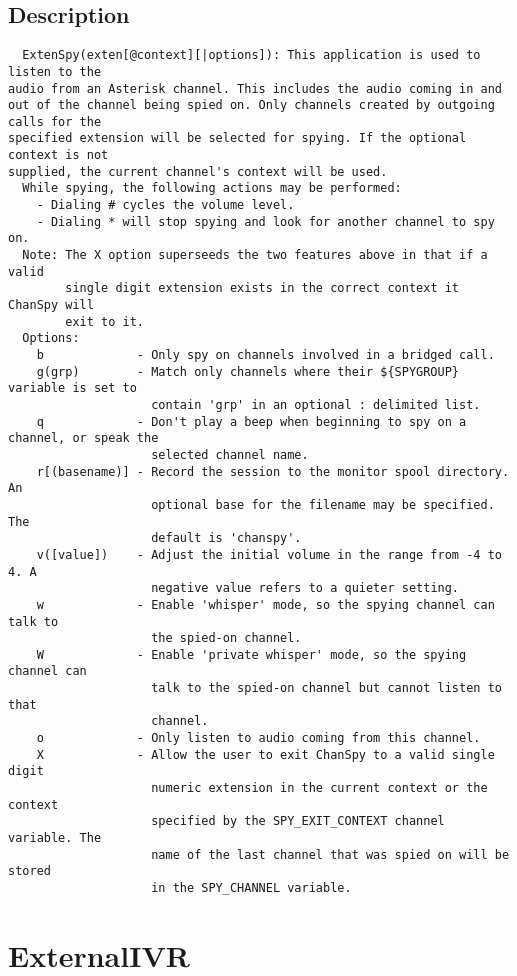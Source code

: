 \subsection{Description}
\begin{verbatim}
  ExtenSpy(exten[@context][|options]): This application is used to listen to the
audio from an Asterisk channel. This includes the audio coming in and
out of the channel being spied on. Only channels created by outgoing calls for the
specified extension will be selected for spying. If the optional context is not
supplied, the current channel's context will be used.
  While spying, the following actions may be performed:
    - Dialing # cycles the volume level.
    - Dialing * will stop spying and look for another channel to spy on.
  Note: The X option superseeds the two features above in that if a valid
        single digit extension exists in the correct context it ChanSpy will
        exit to it.
  Options:
    b             - Only spy on channels involved in a bridged call.
    g(grp)        - Match only channels where their ${SPYGROUP} variable is set to
                    contain 'grp' in an optional : delimited list.
    q             - Don't play a beep when beginning to spy on a channel, or speak the
                    selected channel name.
    r[(basename)] - Record the session to the monitor spool directory. An
                    optional base for the filename may be specified. The
                    default is 'chanspy'.
    v([value])    - Adjust the initial volume in the range from -4 to 4. A
                    negative value refers to a quieter setting.
    w             - Enable 'whisper' mode, so the spying channel can talk to
                    the spied-on channel.
    W             - Enable 'private whisper' mode, so the spying channel can
                    talk to the spied-on channel but cannot listen to that
                    channel.
    o             - Only listen to audio coming from this channel.
    X             - Allow the user to exit ChanSpy to a valid single digit
                    numeric extension in the current context or the context
                    specified by the SPY_EXIT_CONTEXT channel variable. The
                    name of the last channel that was spied on will be stored
                    in the SPY_CHANNEL variable.

\end{verbatim}


\section{ExternalIVR}
